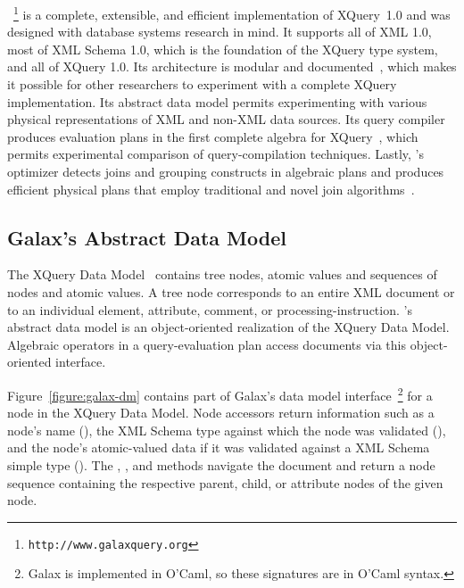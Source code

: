\Galax{}~\footnote{\texttt{http://www.galaxquery.org}} is a complete,
extensible, and efficient implementation of XQuery~1.0 and was
designed with database systems research in mind.  It supports all of
XML 1.0, most of XML Schema 1.0, which is the foundation of the XQuery
type system, and all of XQuery 1.0.  Its architecture is modular and
documented~\cite{galax:edbt2004}, which makes it possible for other
researchers to experiment with a complete XQuery implementation.  Its
abstract data model permits experimenting with various physical
representations of XML and non-XML data sources.  Its query compiler
produces evaluation plans in the first complete algebra for
XQuery~\cite{galax:icde2006}, which permits experimental comparison of
query-compilation techniques. 
Lastly, \Galax{}'s optimizer detects
joins and grouping constructs in algebraic plans and produces
efficient physical plans that employ traditional and novel join
algorithms~\cite{galax:icde2006}.

\subsection{Galax's Abstract Data Model}

The XQuery Data Model~\cite{XPath:DataModel} contains tree nodes,
atomic values and sequences of nodes and atomic values.  A tree node
corresponds to an entire XML document or to an individual element,
attribute, comment, or processing-instruction.  \Galax{}'s abstract
data model is an object-oriented realization of the XQuery Data Model.
Algebraic operators in a query-evaluation plan access documents via
this object-oriented interface.

Figure~\ref{figure:galax-dm} contains part of Galax's data model
interface~\footnote{Galax is implemented in O'Caml, so these
signatures are in O'Caml syntax.} for a node in the XQuery Data Model.
Node accessors return information such as a node's name
(), the XML Schema type against which the node was
validated (), and the node's atomic-valued data if it was
validated against a XML Schema simple type ().  The
, , and  methods navigate the
document and return a node sequence containing the respective parent,
child, or attribute nodes of the given node.

